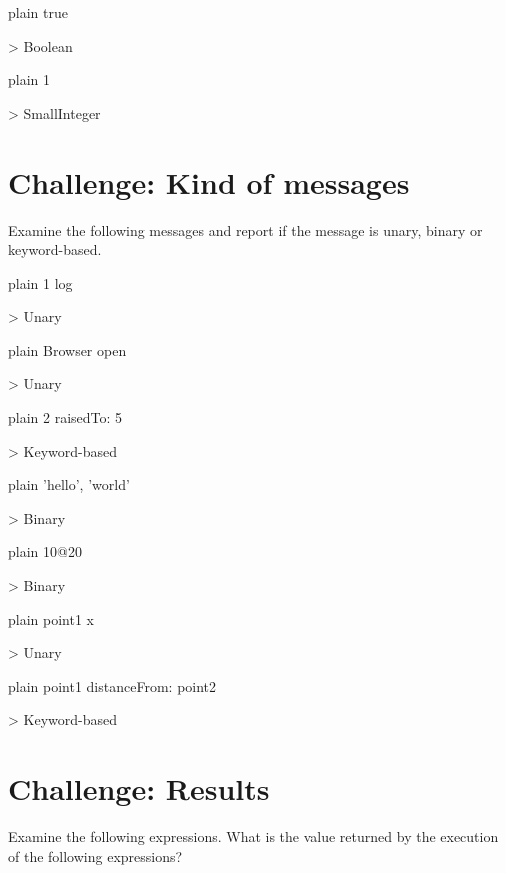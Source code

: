 \documentclass[10pt,twoside,english]{_support/latex/sbabook/sbabook}
\begin{document}
\begin{displaycode}{plain}
true

> Boolean
\end{displaycode}

\begin{displaycode}{plain}
1

> SmallInteger
\end{displaycode}
\section{Challenge: Kind of messages}
Examine the following messages and report if the message is unary, binary or keyword-based.

\begin{displaycode}{plain}
1 log

> Unary
\end{displaycode}

\begin{displaycode}{plain}
Browser open

> Unary
\end{displaycode}

\begin{displaycode}{plain}
2 raisedTo: 5

> Keyword-based
\end{displaycode}

\begin{displaycode}{plain}
'hello', 'world'

> Binary
\end{displaycode}

\begin{displaycode}{plain}
10@20

> Binary
\end{displaycode}

\begin{displaycode}{plain}
point1 x

> Unary
\end{displaycode}

\begin{displaycode}{plain}
point1 distanceFrom: point2

> Keyword-based
\end{displaycode}
\section{Challenge: Results}
Examine the following expressions. What is the value returned by the execution of the following expressions?
\end{document}
